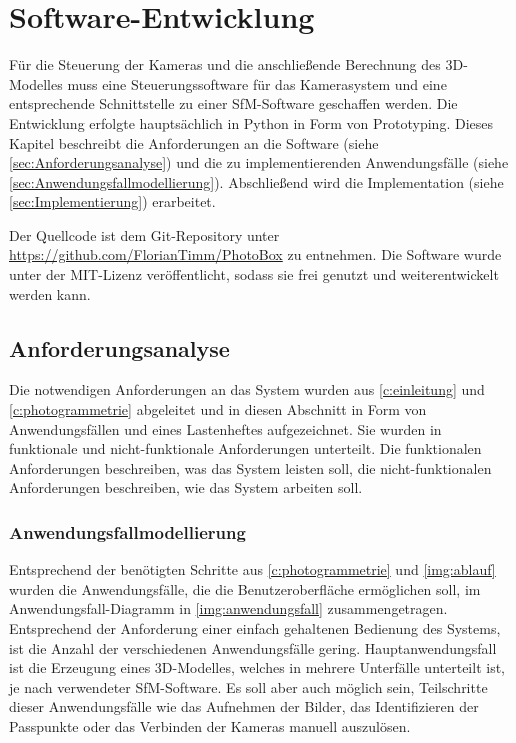 \documentclass[./00PhotoBox.tex]{subfiles}
\begin{document}
\renewcommand{\itemautorefname}{Anforderung}

\chapter{Software-Entwicklung}
\label{c:software}

Für die Steuerung der Kameras und die anschließende Berechnung des 3D-Modelles muss eine Steuerungssoftware für das Kamerasystem und eine entsprechende Schnittstelle zu einer \Gls{SfM}-Software geschaffen werden. Die Entwicklung erfolgte hauptsächlich in Python in Form von Prototyping. Dieses Kapitel beschreibt die Anforderungen an die Software (siehe \autoref{sec:Anforderungsanalyse}) und die zu implementierenden Anwendungsfälle (siehe \autoref{sec:Anwendungsfallmodellierung}). Abschließend wird die Implementation (siehe \autoref{sec:Implementierung}) erarbeitet.

Der Quellcode ist dem Git-Repository unter \url{https://github.com/FlorianTimm/PhotoBox} zu entnehmen. Die Software wurde unter der MIT-Lizenz veröffentlicht, sodass sie frei genutzt und weiterentwickelt werden kann.

\section{Anforderungsanalyse}
\label{sec:Anforderungsanalyse}

Die notwendigen Anforderungen an das System wurden aus \autoref{c:einleitung} und \ref{c:photogrammetrie} abgeleitet und in diesen Abschnitt in Form von Anwendungsfällen und eines Lastenheftes aufgezeichnet. Sie wurden in funktionale und nicht-funktionale Anforderungen unterteilt. Die funktionalen Anforderungen beschreiben, was das System leisten soll, die nicht-funktionalen Anforderungen beschreiben, wie das System arbeiten soll.


\subsection{Anwendungsfallmodellierung}
\label{sec:Anwendungsfallmodellierung}

Entsprechend der benötigten Schritte aus \autoref{c:photogrammetrie} und \autoref{img:ablauf} wurden die Anwendungsfälle, die die Benutzeroberfläche ermöglichen soll, im Anwendungsfall-Dia\-gramm in \autoref{img:anwendungsfall} zusammengetragen. Entsprechend der Anforderung einer einfach gehaltenen Bedienung des Systems, ist die Anzahl der verschiedenen Anwendungsfälle gering. Hauptanwendungsfall ist die Erzeugung eines 3D-Modelles, welches in mehrere Unterfälle unterteilt ist, je nach verwendeter \Gls{SfM}-Software. Es soll aber auch möglich sein, Teilschritte dieser Anwendungsfälle wie das Aufnehmen der Bilder, das Identifizieren der Passpunkte oder das Verbinden der Kameras manuell auszulösen.
\end{document}
